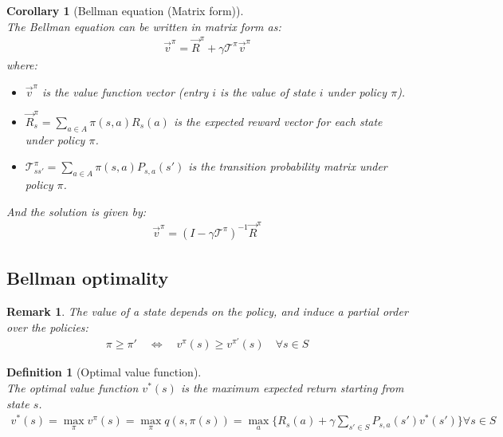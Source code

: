 \documentclass[11pt]{book} %
\newtheorem{definition}{Definition}[section]
\newtheorem{corollary}{Corollary}[section]
\newtheorem*{remark*}{Remark}
\begin{document}
\begin{corollary}[Bellman equation (Matrix form)]\ \\
    The Bellman equation can be written in matrix form as:
    \begin{align*}
        \vec{v}^{\pi} = \vec{R}^{\pi} + \gamma \mathcal{T}^{\pi} \vec{v}^{\pi}
    \end{align*}
    where:
    \begin{itemize}
        \item $\vec{v}^{\pi}$ is the value function vector (entry $i$ is the value of state $i$ under policy $\pi$).
        \item $\vec{R}_s^{\pi} = \sum_{a \in A} \pi(s, a) R_s(a)$ is the expected reward vector for each state under policy $\pi$.
        \item $\mathcal{T}_{ss'}^{\pi} = \sum_{a \in A} \pi(s, a) P_{s,a}(s')$ is the transition probability matrix under policy $\pi$.
    \end{itemize}
    And the solution is given by:
    \begin{align*}
        \vec{v}^{\pi} = (I - \gamma \mathcal{T} ^{\pi})^{-1} \vec{R}^{\pi}
    \end{align*}

\end{corollary}


\subsection{Bellman optimality}
\begin{remark*}
    The value of a state depends on the policy, and induce a partial order over the policies: 
    \begin{align*}
        \pi \geq \pi' \quad \iff \quad v^{\pi}(s) \geq v^{\pi'}(s) \quad \forall s \in S
    \end{align*}
\end{remark*}

\begin{definition}[Optimal value function]\ \\
    The optimal value function $v^*(s)$ is the maximum expected return starting from state $s$.
    \begin{align*}
        v^*(s) = \max_{\pi} v^{\pi}(s) = \max_{\pi} q(s, \pi(s)) = \max_{a} \{R_s(a) + \gamma \sum_{s' \in S} P_{s,a}(s') v^*(s') \} \forall s \in S
    \end{align*}
\end{definition}
\end{document}
